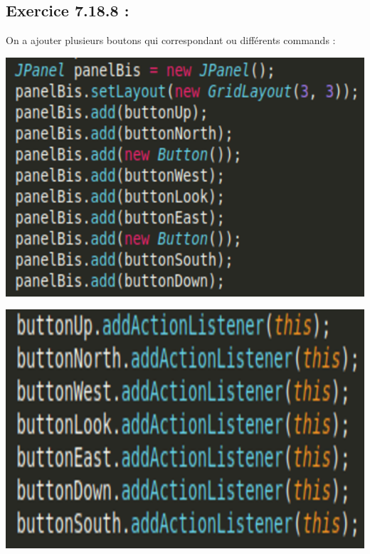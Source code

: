 \documentclass[french,10pt,a4paper]{report}
\begin{document}
\subsection{\textcolor{bb}{Exercice 7.18.8 :}}
On a ajouter plusieurs boutons qui correspondant ou différents commands :
\begin{center}
\begin{minipage}{0.4\textwidth}
	\begin{flushleft}
		\includegraphics[scale=0.2]{captures/it2_3.png}
	\end{flushleft}
\end{minipage}
\begin{minipage}{0.4\textwidth}
	\begin{flushright}
		\includegraphics[scale=0.2]{captures/it2_4.png}
	\end{flushright}
\end{minipage}

\end{center}
\end{document}

